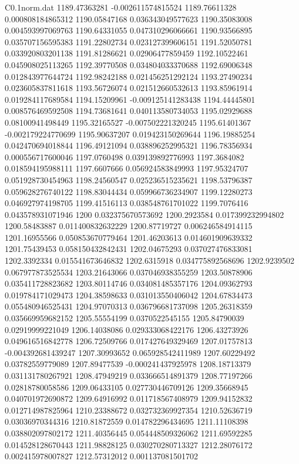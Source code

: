 \begin{filecontents}{C0.1norm.dat}
1189.47363281		-0.002611574815524
1189.76611328		0.000808184865312
1190.05847168		0.036343049577623
1190.35083008		0.004593997069763
1190.64331055		0.047310296066661
1190.93566895		0.035707156595383
1191.22802734		0.023127399606151
1191.52050781		0.033920803201138
1191.81286621		0.02906477859459
1192.10522461		0.045908025113265
1192.39770508		0.034804033370688
1192.69006348		0.012843977644724
1192.98242188		0.021456251292124
1193.27490234		0.023605837811618
1193.56726074		0.021512660532613
1193.85961914		0.019284117689584
1194.15209961		-0.009125141283438
1194.44445801		0.008576469592508
1194.73681641		0.040113580734053
1195.02929688		0.08100941498449
1195.32165527		-0.007502221320245
1195.61401367		-0.002179224770699
1195.90637207		0.019423150269644
1196.19885254		0.042470694018844
1196.49121094		0.038896252995321
1196.78356934		0.000556717600046
1197.0760498		0.039139892776993
1197.3684082		0.018594195988111
1197.6607666		0.056924583849993
1197.95324707		0.051928730454963
1198.24560547		0.025236515235621
1198.53796387		0.059628276740122
1198.83044434		0.059966736234907
1199.12280273		0.046927974198705
1199.41516113		0.038548761701022
1199.7076416		0.043578931071946
1200		0.032375670573692
1200.2923584		0.017399232994802
1200.58483887		0.011400832632229
1200.87719727		0.006246584914115
1201.16955566		0.050853670779464
1201.46203613		0.014601909639332
1201.75439453		0.058150432842431
1202.04675293		0.037027476833081
1202.3392334		0.015541673646832
1202.6315918		0.034775892568696
1202.9239502		0.067977873525534
1203.21643066		0.037046938355259
1203.50878906		0.035411728823682
1203.80114746		0.034081485357176
1204.09362793		0.019784171029473
1204.38598633		0.031013550406042
1204.67834473		0.055480946525431
1204.97070313		0.036796681737098
1205.26318359		0.035669959682152
1205.55554199		0.0370522545155
1205.84790039		0.02919999221049
1206.14038086		0.029333068422176
1206.43273926		0.049616516842778
1206.72509766		0.017427649329469
1207.01757813		-0.004392681439247
1207.30993652		0.065928542411989
1207.60229492		0.03782559779089
1207.89477539		-0.000241437925978
1208.18713379		0.031131780267921
1208.47949219		0.033666514891379
1208.77197266		0.02818780058586
1209.06433105		0.027730446709126
1209.35668945		0.040701972690872
1209.64916992		0.011718567408979
1209.94152832		0.012714987825964
1210.23388672		0.032732369927354
1210.52636719		0.03036970344316
1210.81872559		0.014782296434695
1211.11108398		0.038802097802172
1211.40356445		0.054448509326062
1211.69592285		0.014528128670443
1211.98828125		0.030270280713327
1212.28076172		0.002415978007827
1212.57312012		0.001137081501702

\end{filecontents}
